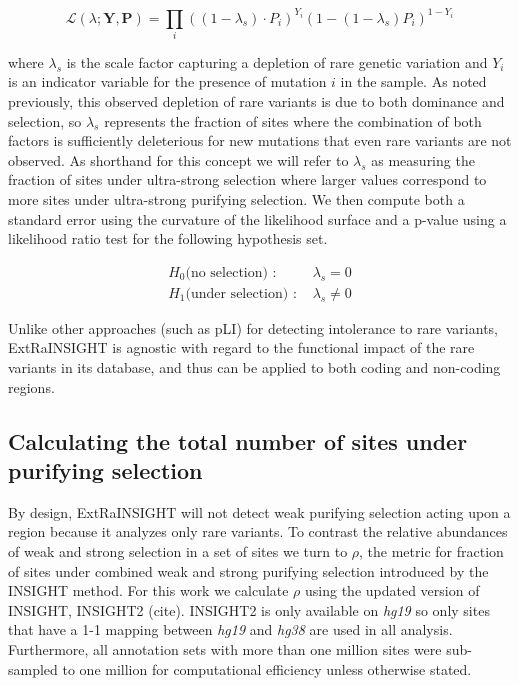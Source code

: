 \documentclass[11pt]{article}
\newcommand{\mathbb}[1]{\boldsymbol{\mathbf{#1}}}
\begin{document}
\begin{equation}
\mathcal{L}(\lambda ;\mathbb{Y},\mathbb{P}) = \prod_i ((1-\lambda_s) \cdot P_i)^{Y_i}(1- (1-\lambda_s) P_i)^{1-Y_i}
\end{equation}

\noindent where $\lambda_s$ is the scale factor capturing a depletion of rare genetic variation and $Y_i$ is an indicator variable for the presence of mutation $i$ in the sample. As noted previously, this observed depletion of rare variants is due to both dominance and selection, so $\lambda_s$ represents the fraction of sites where the combination of both factors is sufficiently deleterious for new mutations that even rare variants are not observed. As shorthand for this concept we will refer to $\lambda_s$ as measuring the fraction of sites under ultra-strong selection where larger values correspond to more sites under ultra-strong purifying selection. We then compute both a standard error using the curvature of the likelihood surface and a p-value using a likelihood ratio test for the following hypothesis set.

\begin{align}
H_0\text{(no selection) : } & \lambda_s = 0\\
H_1\text{(under selection) : } & \lambda_s \neq 0
\end{align}

Unlike other approaches (such as pLI) for detecting intolerance to rare variants, ExtRaINSIGHT is agnostic with regard to the functional impact of the rare variants in its database, and thus can be applied to both coding and non-coding regions.

\subsection*{Calculating the total number of sites under purifying selection}
By design, ExtRaINSIGHT will not detect weak purifying selection acting upon a region because it analyzes only rare variants. To contrast the relative abundances of weak and strong selection in a set of sites we turn to $\rho$, the metric for fraction of sites under combined weak and strong purifying selection introduced by the INSIGHT method. For this work we calculate $\rho$ using the updated version of INSIGHT, INSIGHT2 (cite). INSIGHT2 is only available on \textit{hg19} so only sites that have a 1-1 mapping between \textit{hg19} and \textit{hg38} are used in all analysis. Furthermore, all annotation sets with more than one million sites were sub-sampled to one million for computational efficiency unless otherwise stated.
\end{document}
